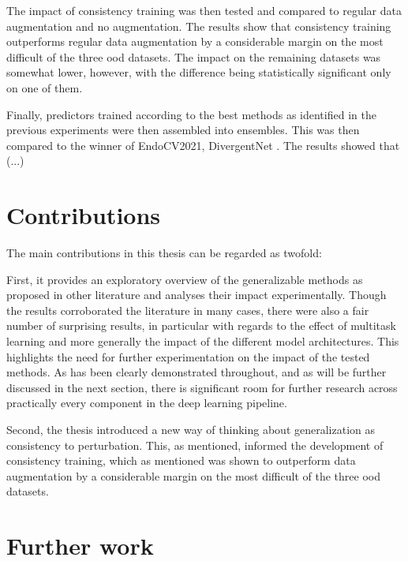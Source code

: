 The impact of consistency training was then tested and compared to regular data augmentation and no augmentation. The results show that consistency training outperforms regular data augmentation by a considerable margin on the most difficult of the three \gls{ood} datasets. The impact on the remaining datasets was somewhat lower, however, with the difference being statistically significant only on one of them. 

Finally, predictors trained according to the best methods as identified in the previous experiments were then assembled into ensembles. This was then compared to the winner of EndoCV2021, DivergentNet \cite{divergentnets}. The results showed that (...) 


\section{Contributions}
The main contributions in this thesis can be regarded as twofold:

First, it provides an exploratory overview of the generalizable methods as proposed in other literature and analyses their impact experimentally. Though the results corroborated the literature in many cases, there were also a fair number of surprising results, in particular with regards to the effect of multitask learning and more generally the impact of the different model architectures. This highlights the need for further experimentation on the impact of the tested methods. As has been clearly demonstrated throughout, and as will be further discussed in the next section, there is significant room for further research across practically every component in the deep learning pipeline. 

Second, the thesis introduced a new way of thinking about generalization as consistency to perturbation. This, as mentioned, informed the development of consistency training, which as mentioned was shown to outperform data augmentation by a considerable margin on the most difficult of the three \gls{ood} datasets. 

\section{Further work}
